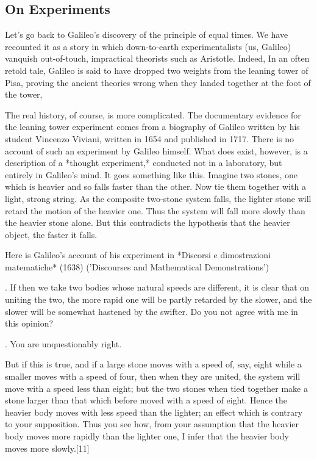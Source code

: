 \subsection{On Experiments}

Let's go back to Galileo's discovery of the principle of equal times.  We have recounted it as a story in which down-to-earth experimentalists (us, Galileo) vanquish out-of-touch, impractical theorists such as Aristotle.  Indeed, In an often retold tale, Galileo is said to have dropped two weights from the leaning tower of Pisa, proving the ancient theories wrong when they landed together at the foot of the tower,

The real history, of course, is more complicated. The documentary evidence for the leaning tower experiment comes from a biography of Galileo written by his student Vincenzo Viviani, written in 1654 and published in 1717.  There is no account of such an experiment by Galileo himself.  What does exist, however, is a description of a *thought experiment,* conducted not in a laboratory, but entirely in Galileo's mind. It goes something like this.  Imagine two stones, one which is heavier and so falls faster than the other. Now tie them together with a light, strong string.  As the composite two-stone system falls, the lighter stone will retard the motion of the heavier one.  Thus the system will fall more slowly than the heavier stone alone.  But this contradicts the hypothesis that the heavier object, the faster it falls. 


Here is Galileo's account of his experiment in *Discorsi e dimostrazioni matematiche* (1638) ('Discourses and Mathematical Demonstrations') 


\begin{indent}
.  If then we take two bodies whose natural speeds are different, it is clear that on uniting the two, the more rapid one will be partly retarded by the slower, and the slower will be somewhat hastened by the swifter. Do you not agree with 
me in this opinion?
\end{indent}

\begin{indent}
. You are unquestionably right.
\end{indent}

\begin{indent}
 But if this is true, and if a large stone moves with a speed of, say, eight while a smaller moves with a speed of four, then when they are united, the system will move with a speed less than eight; but the two stones when tied together make a stone larger than that which before moved with a speed of eight. Hence the heavier body moves with less speed than the lighter; an effect which is contrary to your supposition. Thus you see how, from your assumption that the heavier body moves more rapidly than the lighter one, I infer that the heavier body moves more slowly.[11]
\end{indent}


